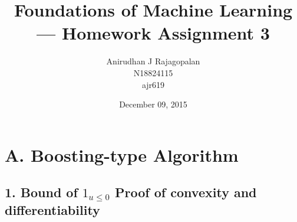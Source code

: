 \documentclass{article}
\begin{document}
\title{Foundations of Machine Learning --- Homework Assignment 3}
\date{December 09, 2015}
\author{Anirudhan J Rajagopalan\\ N18824115\\ ajr619}

\maketitle

\newpage

\section*{A. Boosting-type Algorithm}
\subsection*{1. Bound of \( 1_{u \le 0} \) Proof of convexity and differentiability}
\end{document}
